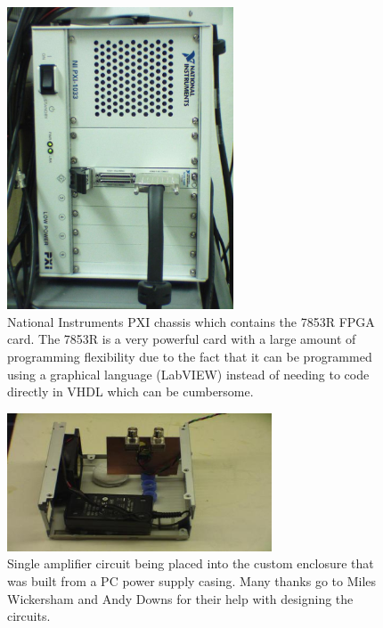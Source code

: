 \begin{figure}[ht!]
\centering
\includegraphics[width=0.6\textwidth]{eps_pics/fpgaCard}
\caption{National Instruments PXI chassis which contains the 7853R FPGA card. The 7853R is a very powerful card with a large amount of programming flexibility due to the fact that it can be programmed using a graphical language (LabVIEW) instead of needing to code directly in VHDL which can be cumbersome.
	 \label{fig:fpgaCard}} 
\end{figure}

\begin{figure}[ht!]
\centering
\includegraphics[width=0.7\textwidth]{eps_pics/oneAmp}
\caption{Single amplifier circuit being placed into the custom enclosure that was built from a PC power supply casing. Many thanks go to Miles Wickersham and Andy Downs for their help with designing the circuits.
	 \label{fig:oneAmp}} 
\end{figure}


